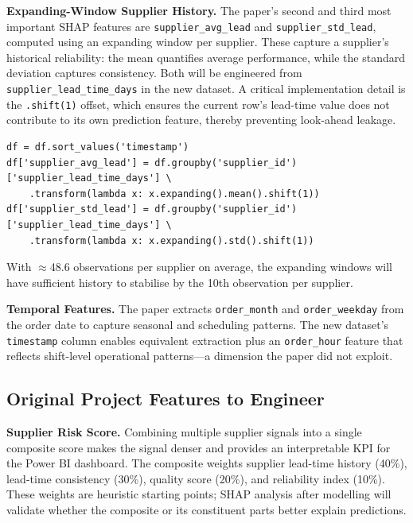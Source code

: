 \documentclass[11pt,a4paper]{article}
\begin{document}
\textbf{Expanding-Window Supplier History.} The paper's second and third most important
SHAP features are \texttt{supplier\_avg\_lead} and \texttt{supplier\_std\_lead},
computed using an expanding window per supplier. These capture a supplier's historical
reliability: the mean quantifies average performance, while the standard deviation
captures consistency. Both will be engineered from \texttt{supplier\_lead\_time\_days}
in the new dataset. A critical implementation detail is the \texttt{.shift(1)} offset,
which ensures the current row's lead-time value does not contribute to its own
prediction feature, thereby preventing look-ahead leakage.

\begin{tcolorbox}[adoptbox, title={Expanding Window --- Implementation Spec}]
\begin{verbatim}
df = df.sort_values('timestamp')
df['supplier_avg_lead'] = df.groupby('supplier_id')['supplier_lead_time_days'] \
    .transform(lambda x: x.expanding().mean().shift(1))
df['supplier_std_lead'] = df.groupby('supplier_id')['supplier_lead_time_days'] \
    .transform(lambda x: x.expanding().std().shift(1))
\end{verbatim}
With $\approx$48.6 observations per supplier on average, the expanding windows will
have sufficient history to stabilise by the 10th observation per supplier.
\end{tcolorbox}

\textbf{Temporal Features.} The paper extracts \texttt{order\_month} and
\texttt{order\_weekday} from the order date to capture seasonal and scheduling patterns.
The new dataset's \texttt{timestamp} column enables equivalent extraction plus an
\texttt{order\_hour} feature that reflects shift-level operational patterns---a
dimension the paper did not exploit.

\subsection{Original Project Features to Engineer}

\textbf{Supplier Risk Score.} Combining multiple supplier signals into a single
composite score makes the signal denser and provides an interpretable KPI for the
Power BI dashboard. The composite weights supplier lead-time history (40\%), lead-time
consistency (30\%), quality score (20\%), and reliability index (10\%). These weights
are heuristic starting points; SHAP analysis after modelling will validate whether
the composite or its constituent parts better explain predictions.
\end{document}
